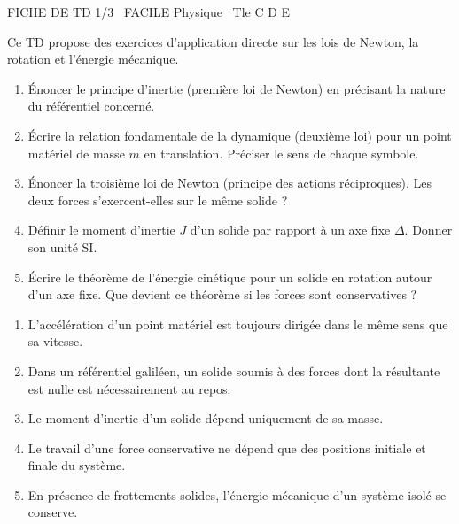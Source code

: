 \documentclass[11pt]{article}
\begin{document}
\begin{tcolorbox}[enhanced,colback=popink,colframe=popink,arc=10pt,boxrule=0pt,left=12pt,right=12pt,top=9pt,bottom=9pt]
{\color{white}\popxbold\small FICHE DE TD 1/3 \textbullet\ FACILE \hfill Physique \textbullet\ Tle C D E\par}
\end{tcolorbox}
\vspace{4pt}
Ce TD propose des exercices d'application directe sur les lois de Newton, la rotation et l'énergie mécanique.

\begin{exercice}
\begin{enumerate}
    \item Énoncer le principe d'inertie (première loi de Newton) en précisant la nature du référentiel concerné.
    \item Écrire la relation fondamentale de la dynamique (deuxième loi) pour un point matériel de masse $m$ en translation. Préciser le sens de chaque symbole.
    \item Énoncer la troisième loi de Newton (principe des actions réciproques). Les deux forces s'exercent-elles sur le même solide ?
    \item Définir le moment d'inertie $J$ d'un solide par rapport à un axe fixe $\Delta$. Donner son unité SI.
    \item Écrire le théorème de l'énergie cinétique pour un solide en rotation autour d'un axe fixe. Que devient ce théorème si les forces sont conservatives ?
\end{enumerate}
\end{exercice}

\begin{exercice}
\begin{enumerate}
    \item L'accélération d'un point matériel est toujours dirigée dans le même sens que sa vitesse.
    \item Dans un référentiel galiléen, un solide soumis à des forces dont la résultante est nulle est nécessairement au repos.
    \item Le moment d'inertie d'un solide dépend uniquement de sa masse.
    \item Le travail d'une force conservative ne dépend que des positions initiale et finale du système.
    \item En présence de frottements solides, l'énergie mécanique d'un système isolé se conserve.
\end{enumerate}
\end{exercice}
\end{document}
